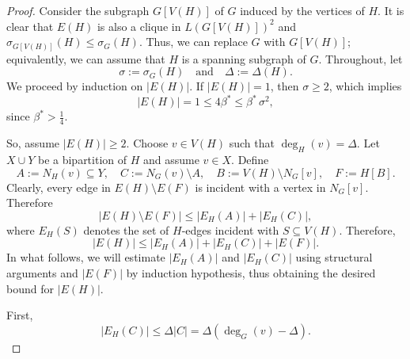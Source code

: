 \documentclass[11pt]{article}
\theoremstyle{plain}
\numberwithin{equation}{section}
\begin{document}
\begin{proof}
Consider the subgraph $G[V(H)]$ of $G$ induced by the vertices of $H$. It is clear that $E(H)$ is also a clique in $L(G[V(H)])^2$ and $\sigma_{G[V(H)]}(H) \le \sigma_G(H)$. Thus, we can replace $G$ with $G[V(H)]$; equivalently, we can assume that $H$ is a spanning subgraph of $G$. Throughout, let
\[
   \sigma:=\sigma_G(H)\quad \text{and} \quad \Delta:=\Delta(H).
\]
We proceed by induction on $|E(H)|$. If $|E(H)|=1$, then $\sigma\ge 2$, which implies
\[
   |E(H)|=1\le 4\beta^*\le \beta^*\,\sigma^2,
\]
since $\beta^* > \frac{1}{4}$. 

So, assume $|E(H)|\ge 2$. Choose $v\in V(H)$ such that $\deg_H(v)=\Delta$. Let $X\cup Y$ be a bipartition
of $H$ and assume $v\in X$. Define
\[
   A:=N_H(v)\subseteq Y,  \quad  C:= N_G(v)\setminus A, \quad B:=V(H)\setminus N_G[v], \quad  F:=H[B].
\]
Clearly, every edge in $E(H)\setminus E(F)$ is incident with a vertex in $N_G[v]$. Therefore
\[
   |E(H)\setminus E(F)|\le |E_H(A)| + |E_H(C)|,
\]
where $E_H(S)$ denotes the set of $H$-edges incident with $S\subseteq V(H)$.
Therefore, 
\begin{equation}\label{eq:H_bound_1}
   |E(H)|\le |E_H(A)| + |E_H(C)| + |E(F)|. 
\end{equation}
In what follows, we will estimate $|E_H(A)|$ and $|E_H(C)|$ using structural arguments and $|E(F)|$ by induction hypothesis, thus obtaining the desired bound for $|E(H)|$.

First,
\begin{equation}\label{eq:C_bound}
   |E_H(C)|\le \Delta |C| =\Delta(\deg_G(v)-\Delta).
\end{equation}


\end{proof}
\end{document}
